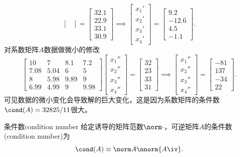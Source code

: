 \begin{example}
\[\begin{bmatrix}
        \end{bmatrix}=\begin{bmatrix}
            32.1\\22.9\\33.1\\30.9
        \end{bmatrix}\implies\begin{bmatrix}
            x_1'\\x_2'\\x_3'\\x_4'
        \end{bmatrix}=\begin{bmatrix}
            9.2\\-12.6\\4.5\\-1.1
        \end{bmatrix}.
    \]
    对系数矩阵$A$数据做微小的修改
    \[
        \begin{bmatrix}
            10&7&8.1&7.2\\
            7.08&5.04&6&5\\
            8&5.98&9.89&9\\
            6.99&4.99&9&9.98
        \end{bmatrix}\begin{bmatrix}
            x_1''\\x_2''\\x_3''\\x_4''
        \end{bmatrix}=\begin{bmatrix}
            32\\23\\33\\31
        \end{bmatrix}\implies\begin{bmatrix}
            x_1''\\x_2''\\x_3''\\x_4''
        \end{bmatrix}=\begin{bmatrix}
            -81\\137\\-34\\22
        \end{bmatrix}.
    \]
    可见数据的微小变化会导致解的巨大变化，这是因为系数矩阵的条件数$\cond(A)=32825/11$很大。
\end{example}

\begin{definition}
    {条件数}{condition number}
    给定诱导的矩阵范数$\norm\cdot$，可逆矩阵$A$的条件数(condition number)为
    \begin{equation}
        \cond(A)\equiv\norm A\nnorm{A\iv}.
    \end{equation}
\end{definition}

